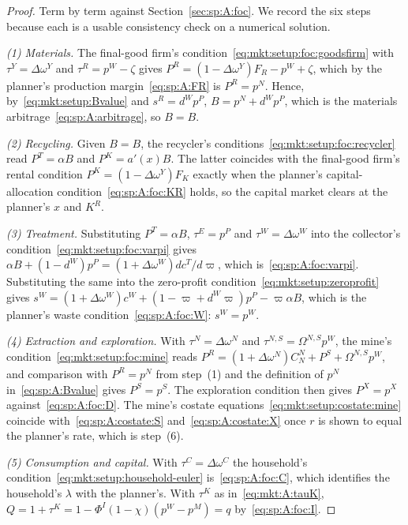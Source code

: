 \begin{proof}
Term by term against Section~\ref{sec:sp:A:foc}. We record the six steps because each is a usable
consistency check on a numerical solution.

\emph{(1) Materials.} The final-good firm's condition~\eqref{eq:mkt:setup:foc:goodsfirm} with
$\tau^Y=\Delta\omega^Y$ and $\tau^R=p^W-\zeta$ gives
$P^R=\left(1-\Delta\omega^Y\right)F_R-p^W+\zeta$, which by the planner's production
margin~\eqref{eq:sp:A:FR} is $P^R=p^N$. Hence, by~\eqref{eq:mkt:setup:Bvalue} and
$s^R=d^Wp^P$, $B=p^N+d^Wp^P$, which is the materials
arbitrage~\eqref{eq:sp:A:arbitrage}, so $B=B$.

\emph{(2) Recycling.} Given $B=B$, the recycler's
conditions~\eqref{eq:mkt:setup:foc:recycler} read $P^T=\alpha B$ and
$P^K=a'\!\left(x\right)B$. The latter coincides with the final-good firm's rental
condition $P^K=\left(1-\Delta\omega^Y\right)F_K$ exactly when the planner's capital-allocation
condition~\eqref{eq:sp:A:foc:KR} holds, so the capital market clears at the planner's $x$ and $K^R$.

\emph{(3) Treatment.} Substituting $P^T=\alpha B$, $\tau^E=p^P$ and
$\tau^W=\Delta\omega^W$ into the collector's condition~\eqref{eq:mkt:setup:foc:varpi} gives
$\alpha B+\left(1-d^W\right)p^P=\left(1+\Delta\omega^W\right)dc^T/d\varpi$, which
is~\eqref{eq:sp:A:foc:varpi}. Substituting the same into the zero-profit
condition~\eqref{eq:mkt:setup:zeroprofit} gives
$s^W=\left(1+\Delta\omega^W\right)c^W+\left(1-\varpi+d^W\varpi\right)p^P-\varpi\alpha B$,
which is the planner's waste condition~\eqref{eq:sp:A:foc:W}: $s^W=p^W$.

\emph{(4) Extraction and exploration.} With $\tau^N=\Delta\omega^N$ and
$\tau^{N,S}=\Omega^{N,S}p^W$, the mine's condition~\eqref{eq:mkt:setup:foc:mine} reads
$P^R=\left(1+\Delta\omega^N\right)C^N_N+P^S+\Omega^{N,S}p^W$, and comparison with
$P^R=p^N$ from step~(1) and the definition of $p^N$
in~\eqref{eq:sp:A:Bvalue} gives $P^S=p^S$. The exploration condition then gives
$P^X=p^X$ against~\eqref{eq:sp:A:foc:D}. The mine's costate
equations~\eqref{eq:mkt:setup:costate:mine} coincide with~\eqref{eq:sp:A:costate:S}
and~\eqref{eq:sp:A:costate:X} once $r$ is shown to equal the planner's rate, which is step~(6).

\emph{(5) Consumption and capital.} With $\tau^C=\Delta\omega^C$ the household's
condition~\eqref{eq:mkt:setup:household-euler} is~\eqref{eq:sp:A:foc:C}, which identifies the
household's $\lambda$ with the planner's. With $\tau^K$ as in~\eqref{eq:mkt:A:tauK},
$Q=1+\tau^K=1-\Phi^I\left(1-\chi\right)\left(p^W-p^M\right)=q$ by~\eqref{eq:sp:A:foc:I}.


\end{proof}
